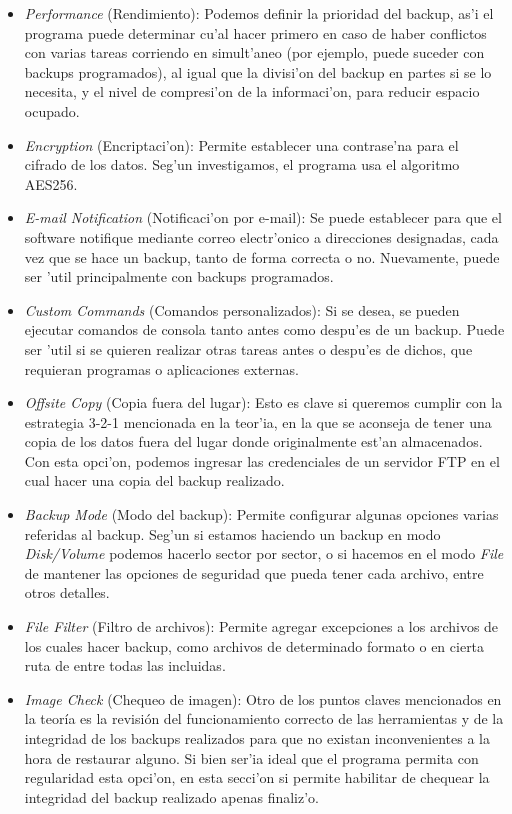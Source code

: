 \documentclass[11pt]{article}
\begin{document}
	\begin{itemize}
		\item \textit{Performance} (Rendimiento): Podemos definir la prioridad del backup, as'i el programa puede determinar cu'al hacer primero en caso de haber conflictos con varias tareas corriendo en simult'aneo (por ejemplo, puede suceder con backups programados), al igual que la divisi'on del backup en partes si se lo necesita, y el nivel de compresi'on de la informaci'on, para reducir espacio ocupado.
		\item \textit{Encryption} (Encriptaci'on): Permite establecer una contrase'na para el cifrado de los datos. Seg'un investigamos, el programa usa el algoritmo AES256.
		\item \textit{E-mail Notification} (Notificaci'on por e-mail): Se puede establecer para que el software notifique mediante correo electr'onico a direcciones designadas, cada vez que se hace un backup, tanto de forma correcta o no. Nuevamente, puede ser 'util principalmente con backups programados.
		\item \textit{Custom Commands} (Comandos personalizados): Si se desea, se pueden ejecutar comandos de consola tanto antes como despu'es de un backup. Puede ser 'util si se quieren realizar otras tareas antes o despu'es de dichos, que requieran programas o aplicaciones externas.
		\item \textit{Offsite Copy} (Copia fuera del lugar): Esto es clave si queremos cumplir con la estrategia 3-2-1 mencionada en la teor'ia, en la que se aconseja de tener una copia de los datos fuera del lugar donde originalmente est'an almacenados. Con esta opci'on, podemos ingresar las credenciales de un servidor FTP en el cual hacer una copia del backup realizado.
		\item \textit{Backup Mode} (Modo del backup): Permite configurar algunas opciones varias referidas al backup. Seg'un si estamos haciendo un backup en modo \textit{Disk/Volume} podemos hacerlo sector por sector, o si hacemos en el modo \textit{File} de mantener las opciones de seguridad que pueda tener cada archivo, entre otros detalles.
		\item \textit{File Filter} (Filtro de archivos): Permite agregar excepciones a los archivos de los cuales hacer backup, como archivos de determinado formato o en cierta ruta de entre todas las incluidas.
		\item \textit{Image Check} (Chequeo de imagen): Otro de los puntos claves mencionados en la teoría es la revisión del funcionamiento correcto de las herramientas y de la integridad de los backups realizados para que no existan inconvenientes a la hora de restaurar alguno. Si bien ser'ia ideal que el programa permita con regularidad esta opci'on, en esta secci'on si permite habilitar de chequear la integridad del backup realizado apenas finaliz'o.
	\end{itemize}
	
\end{document}
